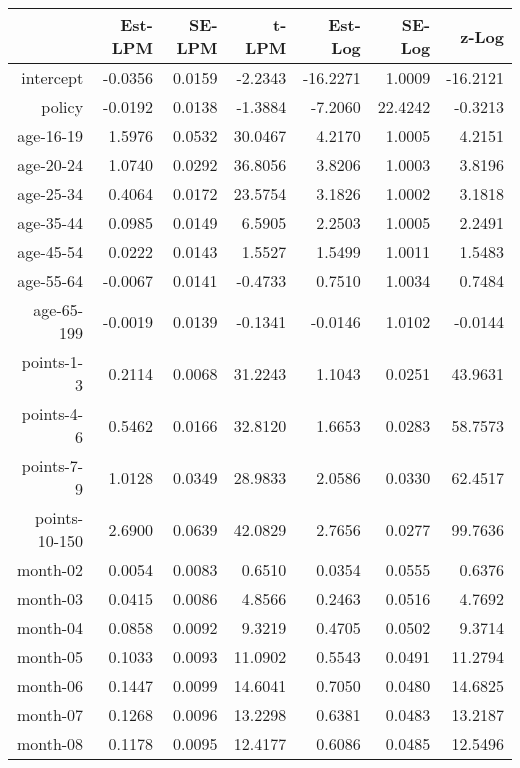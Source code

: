 \documentclass[10pt]{article}
\begin{document}

\begin{table}[ht]
\centering
\begin{tabular}{rrrrrrr}
  \hline
 & Est-LPM & SE-LPM & t-LPM & Est-Log & SE-Log & z-Log \\ 
  \hline
intercept & -0.0356 & 0.0159 & -2.2343 & -16.2271 & 1.0009 & -16.2121 \\ 
  policy & -0.0192 & 0.0138 & -1.3884 & -7.2060 & 22.4242 & -0.3213 \\ 
  age-16-19 & 1.5976 & 0.0532 & 30.0467 & 4.2170 & 1.0005 & 4.2151 \\ 
  age-20-24 & 1.0740 & 0.0292 & 36.8056 & 3.8206 & 1.0003 & 3.8196 \\ 
  age-25-34 & 0.4064 & 0.0172 & 23.5754 & 3.1826 & 1.0002 & 3.1818 \\ 
  age-35-44 & 0.0985 & 0.0149 & 6.5905 & 2.2503 & 1.0005 & 2.2491 \\ 
  age-45-54 & 0.0222 & 0.0143 & 1.5527 & 1.5499 & 1.0011 & 1.5483 \\ 
  age-55-64 & -0.0067 & 0.0141 & -0.4733 & 0.7510 & 1.0034 & 0.7484 \\ 
  age-65-199 & -0.0019 & 0.0139 & -0.1341 & -0.0146 & 1.0102 & -0.0144 \\ 
  points-1-3 & 0.2114 & 0.0068 & 31.2243 & 1.1043 & 0.0251 & 43.9631 \\ 
  points-4-6 & 0.5462 & 0.0166 & 32.8120 & 1.6653 & 0.0283 & 58.7573 \\ 
  points-7-9 & 1.0128 & 0.0349 & 28.9833 & 2.0586 & 0.0330 & 62.4517 \\ 
  points-10-150 & 2.6900 & 0.0639 & 42.0829 & 2.7656 & 0.0277 & 99.7636 \\ 
  month-02 & 0.0054 & 0.0083 & 0.6510 & 0.0354 & 0.0555 & 0.6376 \\ 
  month-03 & 0.0415 & 0.0086 & 4.8566 & 0.2463 & 0.0516 & 4.7692 \\ 
  month-04 & 0.0858 & 0.0092 & 9.3219 & 0.4705 & 0.0502 & 9.3714 \\ 
  month-05 & 0.1033 & 0.0093 & 11.0902 & 0.5543 & 0.0491 & 11.2794 \\ 
  month-06 & 0.1447 & 0.0099 & 14.6041 & 0.7050 & 0.0480 & 14.6825 \\ 
  month-07 & 0.1268 & 0.0096 & 13.2298 & 0.6381 & 0.0483 & 13.2187 \\ 
  month-08 & 0.1178 & 0.0095 & 12.4177 & 0.6086 & 0.0485 & 12.5496 \\ 

\end{tabular}
\end{table}
\end{document}
